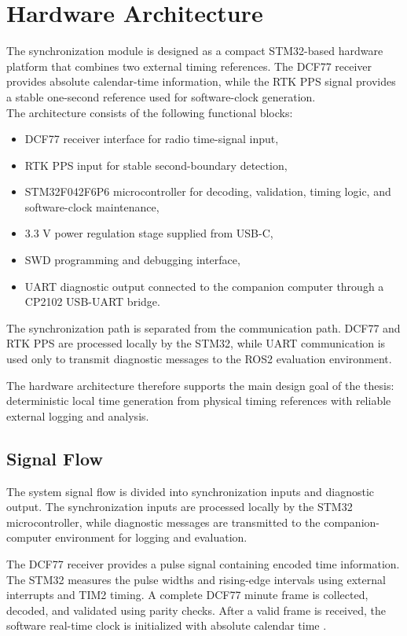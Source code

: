\section{Hardware Architecture}

The synchronization module is designed as a compact STM32-based hardware platform that combines two external timing references. The DCF77 receiver provides absolute calendar-time information, while the RTK PPS signal provides a stable one-second reference used for software-clock generation.
\\
The architecture consists of the following functional blocks:
\begin{itemize}
    \item DCF77 receiver interface for radio time-signal input,
    \item RTK PPS input for stable second-boundary detection,
    \item STM32F042F6P6 microcontroller for decoding, validation, timing logic, and software-clock maintenance,
    \item 3.3 V power regulation stage supplied from USB-C,
    \item SWD programming and debugging interface,
    \item UART diagnostic output connected to the companion computer through a CP2102 USB-UART bridge.
\end{itemize}

The synchronization path is separated from the communication path. DCF77 and RTK PPS are processed locally by the STM32, while UART communication is used only to transmit diagnostic messages to the ROS2 evaluation environment.

The hardware architecture therefore supports the main design goal of the thesis: deterministic local time generation from physical timing references with reliable external logging and analysis.

\subsection{Signal Flow}

The system signal flow is divided into synchronization inputs and diagnostic output. The synchronization inputs are processed locally by the STM32 microcontroller, while diagnostic messages are transmitted to the companion-computer environment for logging and evaluation.

The DCF77 receiver provides a pulse signal containing encoded time information. The STM32 measures the pulse widths and rising-edge intervals using external interrupts and TIM2 timing. A complete DCF77 minute frame is collected, decoded, and validated using parity checks. After a valid frame is received, the software real-time clock is initialized with absolute calendar time \cite{ptbDcf77}.

